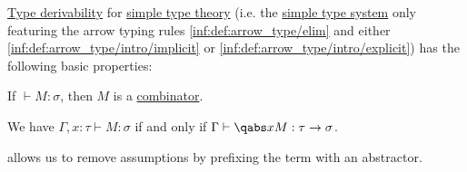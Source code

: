 \begin{proposition}\label{thm:def:simple_type_derivation}
  \hyperref[def:simple_type_derivation]{Type derivability} for \hyperref[con:simple_type_theory/arrow]{simple type theory} (i.e. the \hyperref[def:simple_type_system]{simple type system} only featuring the arrow typing rules \ref{inf:def:arrow_type/elim} and either \ref{inf:def:arrow_type/intro/implicit} or \ref{inf:def:arrow_type/intro/explicit}) has the following basic properties:
  \begin{thmenum}
     If \( \vdash M: \sigma \), then \( M \) is a \hyperref[def:lambda_combinator]{combinator}.

     We have \( \Gamma, x: \tau \vdash M: \sigma \) if and only if \( \Gamma \vdash \qabs x M: \tau \to \sigma \).
  \end{thmenum}
\end{proposition}
\begin{comments}
  \item {} allows us to remove assumptions by prefixing the term with an abstractor.
\end{comments}
